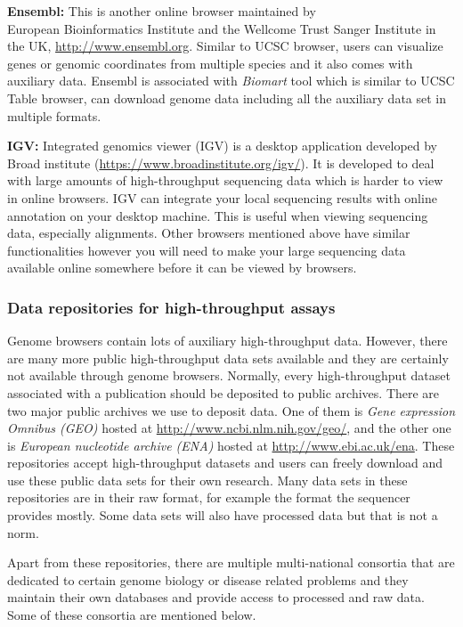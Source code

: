 \documentclass[12pt,]{krantz}
\begin{document}
\textbf{Ensembl:} This is another online browser maintained by\\
European Bioinformatics Institute and the Wellcome Trust Sanger Institute in
the UK, \url{http://www.ensembl.org}.
Similar to UCSC browser, users can visualize genes or genomic coordinates
from multiple species and it also comes with auxiliary data. Ensembl is
associated with \emph{Biomart} tool which is similar to UCSC Table browser, can
download genome data including all the auxiliary data set in multiple formats.

\textbf{IGV:} Integrated genomics viewer (IGV) is a desktop application developed
by Broad institute (\url{https://www.broadinstitute.org/igv/}). It is
developed to deal with large amounts of high-throughput sequencing data which
is harder to view in online browsers. IGV can integrate your local sequencing
results with online annotation on your desktop machine. This is useful when
viewing sequencing data, especially alignments. Other browsers mentioned above
have similar functionalities however you will need to make your large
sequencing data available online somewhere before it can be viewed by browsers.

\hypertarget{data-repositories-for-high-throughput-assays}{%
\subsubsection{Data repositories for high-throughput assays}\label{data-repositories-for-high-throughput-assays}}

Genome browsers contain lots of auxiliary high-throughput data. However, there are
many more public high-throughput data sets available and they are certainly
not available through genome browsers. Normally, every high-throughput dataset
associated with a publication should be deposited to public archives. There
are two major public archives we use to deposit data. One of them is
\emph{Gene expression Omnibus (GEO)} hosted at \url{http://www.ncbi.nlm.nih.gov/geo/},
and the other one is \emph{European nucleotide archive (ENA)} hosted at
\url{http://www.ebi.ac.uk/ena}. These repositories accept high-throughput datasets
and users can freely download and use these public data sets for their
own research. Many data sets in these repositories are in their raw format,
for example the format the sequencer provides mostly. Some data sets will also
have processed data but that is not a norm.

Apart from these repositories, there are multiple multi-national consortia
that are dedicated to certain genome biology or disease related problems and
they maintain their own databases and provide access to processed and raw data.
Some of these consortia are mentioned below.
\end{document}
